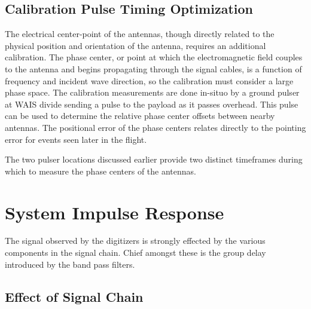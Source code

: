 		
	\subsection{Calibration Pulse Timing Optimization}
		The electrical center-point of the antennas, though directly related to the physical position and orientation of the antenna, requires an additional calibration.  The phase center, or point at which the electromagnetic field couples to the antenna and begins propagating through the signal cables, is a function of frequency and incident wave direction, so the calibration must consider a large phase space.  The calibration measurements are done in-situo by a ground pulser at WAIS divide sending a pulse to the payload as it passes overhead.  This pulse can be used to determine  the relative phase center offsets between nearby antennas.  The positional error of the phase centers relates directly to the pointing error for events seen later in the flight.
		
		The two pulser locations discussed earlier provide two distinct timeframes during which to measure the phase centers of the antennas.  

\section{System Impulse Response}
		The signal observed by the digitizers is strongly effected by the various components in the signal chain.  Chief amongst these is the group delay introduced by the band pass filters.
		
	\subsection{Effect of Signal Chain}
	
